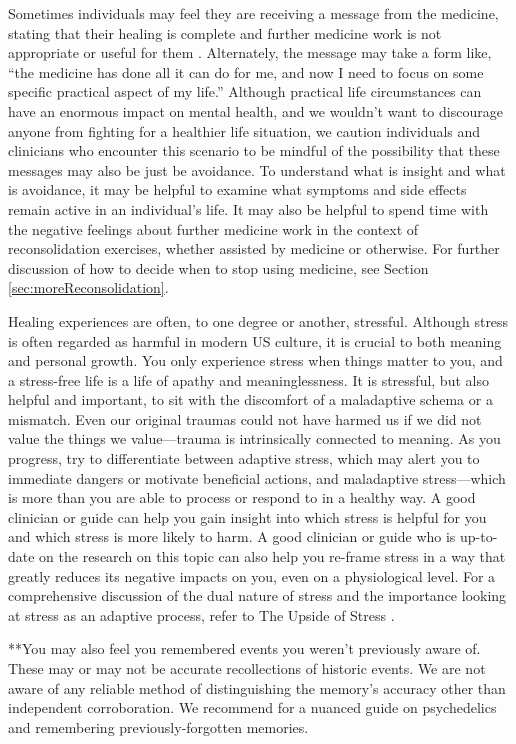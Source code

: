 \documentclass[12pt,letterpaper]{book}
\begin{document}
Sometimes individuals may feel they are receiving a message from the medicine, stating that their healing is complete and further medicine work is not appropriate or useful for them \cite{razviDissociation}. Alternately, the message may take a form like, “the medicine has done all it can do for me, and now I need to focus on some specific practical aspect of my life.” Although practical life circumstances can have an enormous impact on mental health, and we wouldn't want to discourage anyone from fighting for a healthier life situation, we caution individuals and clinicians who encounter this scenario to be mindful of the possibility that these messages may also be just be avoidance. To understand what is insight and what is avoidance, it may be helpful to examine what symptoms and side effects remain active in an individual's life. It may also be helpful to spend time with the negative feelings about further medicine work in the context of reconsolidation exercises, whether assisted by medicine or otherwise. For further discussion of how to decide when to stop using medicine, see Section \ref{sec:moreReconsolidation}.

Healing experiences are often, to one degree or another, stressful. Although stress is often regarded as harmful in modern US culture, it is crucial to both meaning and personal growth. You only experience stress when things matter to you, and a stress-free life is a life of apathy and meaninglessness. It is stressful, but also helpful and important, to sit with the discomfort of a maladaptive schema or a mismatch. Even our original traumas could not have harmed us if we did not value the things we value—trauma is intrinsically connected to meaning. As you progress, try to differentiate between adaptive stress, which may alert you to immediate dangers or motivate beneficial actions, and maladaptive stress—which is more than you are able to process or respond to in a healthy way. A good clinician or guide can help you gain insight into which stress is helpful for you and which stress is more likely to harm. A good clinician or guide who is up-to-date on the research on this topic can also help you re-frame stress in a way that greatly reduces its negative impacts on you, even on a physiological level. For a comprehensive discussion of the dual nature of stress and the importance looking at stress as an adaptive process, refer to The Upside of Stress \cite{mcgonigalStress}.

**You may also feel you remembered events you weren't previously aware of. These may or may not be accurate recollections of historic events. We are not aware of any reliable method of distinguishing the memory's accuracy other than independent corroboration. We recommend \textcite{psychedelicrecoveredmemory} for a nuanced guide on psychedelics and remembering previously-forgotten memories.
\end{document}
